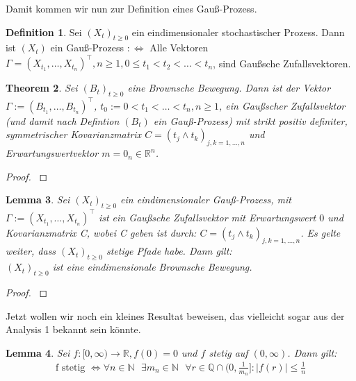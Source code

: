 \documentclass[12pt,a4paper]{scrartcl}
\numberwithin{equation}{section}
\newcommand{\R}{\mathbb{R}} %
\newcommand{\Q}{\mathbb{Q}} %
\newcommand{\N}{\mathbb{N}} %
\numberwithin{equation}{section}%
\newtheorem{thm}{Theorem}[section]%
\newtheorem{lem}[thm]{Lemma}%
\theoremstyle{definition}
\newtheorem{dfn}[thm]{Definition}%
\begin{document}
\noindent Damit kommen wir nun zur Definition eines Gauß-Prozess.

\begin{dfn}
Sei $(X_t)_{t\geq 0}$ ein eindimensionaler stochastischer Prozess. Dann ist $(X_t)$ ein Gauß-Prozess $:\Leftrightarrow$ Alle Vektoren $\Gamma = (X_{t_1},\dots,X_{t_n})^\top, n\geq 1, 0\leq t_1<t_2<\dots<t_n$, sind Gaußsche Zufallsvektoren.
\end{dfn}

\begin{thm}\label{eq:BBistGaussprozess}
Sei $(B_t)_{t\geq 0}$ eine Brownsche Bewegung. Dann ist der Vektor \linebreak$\Gamma := (B_{t_1},\dots,B_{t_n})^\top$, $t_0:=0<t_1<\dots<t_n, n\geq 1$, ein Gaußscher Zufallsvektor (und damit nach Defintion $(B_t)$ ein Gauß-Prozess) mit strikt positiv definiter, symmetrischer Kovarianzmatrix $C = (t_j\land t_k)_{j,k=1,\dots,n}$ und Erwartungswertvektor $m = 0_n\in \R^n$.
\end{thm}

\begin{proof}
\cite[Theorem 2.6, Seite 9 ff]{Schilling}
\end{proof}

\begin{lem}\label{eq:gaussprozessistBB}
Sei $(X_t)_{t\geq 0}$ ein eindimensionaler Gauß-Prozess, mit $\Gamma := (X_{t_1},\dots , X_{t_n})^\top$ ist ein Gaußsche Zufallsvektor mit Erwartungswert $0$ und Kovarianzmatrix C, wobei C geben ist durch: $C = (t_j\land t_k)_{j,k=1,\dots,n}$. Es gelte weiter, dass $(X_t)_{t\geq 0}$ stetige Pfade habe. Dann gilt:\\
$(X_t)_{t\geq 0}$ ist eine eindimensionale Brownsche Bewegung.
\end{lem}

\begin{proof}
\cite[Korollar 2.7, Seite 11]{Schilling}
\end{proof}

\noindent Jetzt wollen wir noch ein kleines Resultat beweisen, das vielleicht sogar aus der Analysis 1 bekannt sein könnte.

\begin{lem}\label{eq:Stetigrational}
Sei $f \colon [0,\infty) \to \R, f(0)=0$ und $f$ stetig auf $(0,\infty)$. Dann gilt:
\begin{align*}
\text{f stetig } \Leftrightarrow \forall n \in \N \text{ } \exists m_n \in \N \text{ } \forall r\in \Q \cap (0,\tfrac{1}{m_n}]: \vert f(r)\vert \leq \frac{1}{n}
\end{align*}
\end{lem}
\end{document}
